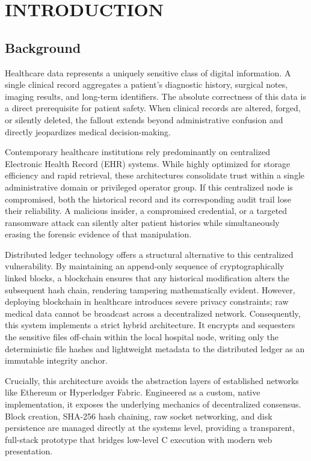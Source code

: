 \documentclass[12pt]{article}
\begin{document}
\newpage
\section{INTRODUCTION}

\subsection{Background}

Healthcare data represents a uniquely sensitive class of digital information. A single clinical record aggregates a patient's diagnostic history, surgical notes, imaging results, and long-term identifiers. The absolute correctness of this data is a direct prerequisite for patient safety. When clinical records are altered, forged, or silently deleted, the fallout extends beyond administrative confusion and directly jeopardizes medical decision-making.

Contemporary healthcare institutions rely predominantly on centralized Electronic Health Record (EHR) systems. While highly optimized for storage efficiency and rapid retrieval, these architectures consolidate trust within a single administrative domain or privileged operator group. If this centralized node is compromised, both the historical record and its corresponding audit trail lose their reliability. A malicious insider, a compromised credential, or a targeted ransomware attack can silently alter patient histories while simultaneously erasing the forensic evidence of that manipulation.

Distributed ledger technology offers a structural alternative to this centralized vulnerability. By maintaining an append-only sequence of cryptographically linked blocks, a blockchain ensures that any historical modification alters the subsequent hash chain, rendering tampering mathematically evident. However, deploying blockchain in healthcare introduces severe privacy constraints; raw medical data cannot be broadcast across a decentralized network. Consequently, this system implements a strict hybrid architecture. It encrypts and sequesters the sensitive files off-chain within the local hospital node, writing only the deterministic file hashes and lightweight metadata to the distributed ledger as an immutable integrity anchor.

Crucially, this architecture avoids the abstraction layers of established networks like Ethereum or Hyperledger Fabric. Engineered as a custom, native implementation, it exposes the underlying mechanics of decentralized consensus. Block creation, SHA-256 hash chaining, raw socket networking, and disk persistence are managed directly at the systems level, providing a transparent, full-stack prototype that bridges low-level C execution with modern web presentation.
\end{document}
